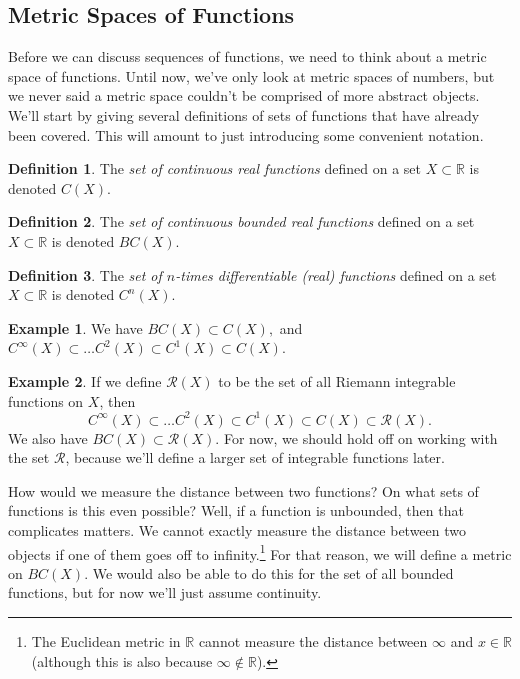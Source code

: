 \documentclass{article}
\newcommand{\R}{\mathbb{R}}
\theoremstyle{definition}
\newtheorem{definition}{Definition}[section]
\newtheorem{example}{Example}[section]
\begin{document}
	\subsection{Metric Spaces of Functions}
	Before we can discuss sequences of functions, we need to think about a metric space of functions. Until now, we've only look at metric spaces of numbers, but we never said a metric space couldn't be comprised of more abstract objects. We'll start by giving several definitions of sets of functions that have already been covered. This will amount to just introducing some convenient notation.
	\begin{definition}
		The \textit{\color{red}set of continuous real functions} defined on a set $ X\subset\R $ is denoted $ C(X)$. 
	\end{definition}
	\begin{definition}
		The \textit{\color{red}set of continuous bounded real functions} defined on a set $ X\subset\R $ is denoted $ BC(X)$. 
	\end{definition}
	\begin{definition}
		The \textit{\color{red}set of $ n $-times differentiable (real) functions} defined on a set $ X\subset\R $ is denoted $ C^n(X) $. 
	\end{definition}
	\begin{example}
		We have $ BC(X)\subset C(X),$ and $C^\infty(X)\subset\ldots C^2(X)\subset C^1(X)\subset C(X) .$
	\end{example}
	\begin{example}
		If we define $ \mathscr{R}(X) $ to be the set of all Riemann integrable functions on $ X $, then $$C^\infty(X)\subset\ldots C^2(X)\subset C^1(X)\subset C(X)\subset\mathscr{R}(X) .$$ We also have $ BC(X)\subset\mathscr{R}(X) $. For now, we should hold off on working with the set $ \mathscr{R} $, because we'll define a larger set of integrable functions later. 
	\end{example}
	How would we measure the distance between two functions? On what sets of functions is this even possible? Well, if a function is unbounded, then that complicates matters. We cannot exactly measure the distance between two objects if one of them goes off to infinity.\footnote{The Euclidean metric in $ \R $ cannot measure the distance between $ \infty $ and $ x\in\R $ (although this is also because $ \infty\notin\R $). } For that reason, we will define a metric on $ BC(X) $. We would also be able to do this for the set of all bounded functions, but for now we'll just assume continuity. 
	
\end{document}
